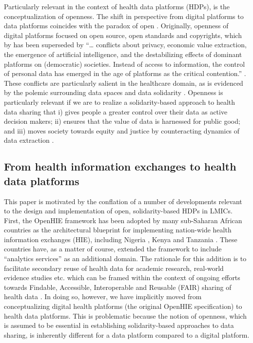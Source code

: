 \documentclass[
  authoryear]{elsarticle}
\begin{document}
Particularly relevant in the context of health data platforms (HDPs), is
the conceptualization of openness. The shift in perspective from digital
platforms to data platforms coincides with the paradox of open
\citep{keller2021paradox}. Originally, openness of digital platforms
focused on open source, open standards and copyrights, which by has been
superseded by ``\ldots{} conflicts about privacy, economic value
extraction, the emergence of artificial intelligence, and the
destabilizing effects of dominant platforms on (democratic) societies.
Instead of access to information, the control of personal data has
emerged in the age of platforms as the critical contention.''
\citep{keller2021paradox}. These conflicts are particularly salient in
the healthcare domain, as is evidenced by the polemic surrounding data
spaces \citep{otto2022designing} and data solidarity
\citep{kickbusch2021lancet, prainsack2022data, prainsack2023beyond}.
Openness is particularly relevant if we are to realize a
solidarity-based approach to health data sharing that i) gives people a
greater control over their data as active decision makers; ii) ensures
that the value of data is harnessed for public good; and iii) moves
society towards equity and justice by counteracting dynamics of data
extraction \citep{prainsack2022data}.

\subsection{From health information exchanges to health data
platforms}\label{from-health-information-exchanges-to-health-data-platforms}

This paper is motivated by the conflation of a number of developments
relevant to the design and implementation of open, solidarity-based HDPs
in LMICs. First, the OpenHIE framework \citep{openhie} has been adopted
by many sub-Saharan African countries \citep{mamuye2022health} as the
architectural blueprint for implementing nation-wide health information
exchanges (HIE), including Nigeria \citep{dalhatu2023paper}, Kenya
\citep{thaiya2021adoption} and Tanzania \citep{nsaghurwe2021one}. These
countries have, as a matter of course, extended the framework to include
``analytics services'' as an additional domain. The rationale for this
addition is to facilitate secondary reuse of health data for academic
research, real-world evidence studies etc. which can be framed within
the context of ongoing efforts towards Findable, Accessible,
Interoperable and Reusable (FAIR) sharing of health data
\citep{guillot2023fair}. In doing so, however, we have implicitly moved
from conceptualizing digital health platforms (the original OpenHIE
specification) to health data platforms. This is problematic because the
notion of openness, which is assumed to be essential in establishing
solidarity-based approaches to data sharing, is inherently different for
a data platform compared to a digital platform.
\end{document}

